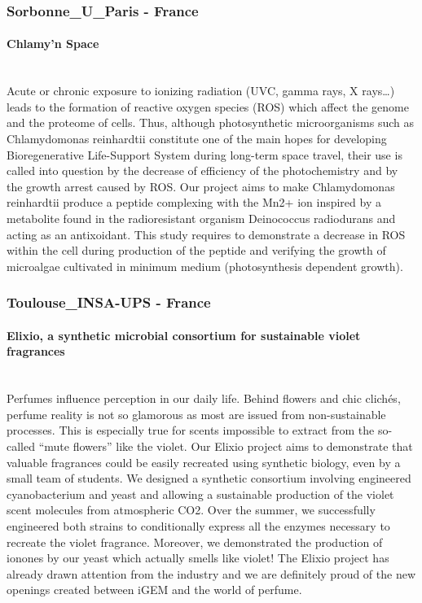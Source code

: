\subsubsection*{Sorbonne\_U\_Paris - France}
\paragraph{Chlamy'n Space}\mbox{} \\
Acute or chronic exposure to ionizing radiation (UVC, gamma rays, X rays…) leads to the formation of reactive oxygen species (ROS) which affect the genome and the proteome of cells. Thus, although photosynthetic microorganisms such as Chlamydomonas reinhardtii constitute one of the main hopes for developing Bioregenerative Life-Support System during long-term space travel, their use is called into question by the decrease of efficiency of the photochemistry and by the growth arrest caused by ROS. Our project aims to make Chlamydomonas reinhardtii produce a peptide complexing with the Mn2+ ion inspired by a metabolite found in the radioresistant organism Deinococcus radiodurans and acting as an antixoidant. This study requires to demonstrate a decrease in ROS within the cell during production of the peptide and verifying the growth of microalgae cultivated in minimum medium (photosynthesis dependent growth).

\subsubsection*{Toulouse\_INSA-UPS - France}
\paragraph{Elixio, a synthetic microbial consortium for sustainable violet fragrances}\mbox{} \\
Perfumes influence perception in our daily life. Behind flowers and chic clichés, perfume reality is not so glamorous as most are issued from non-sustainable processes. This is especially true for scents impossible to extract from the so-called “mute flowers” like the violet. Our Elixio project aims to demonstrate that valuable fragrances could be easily recreated using synthetic biology, even by a small team of students. We designed a synthetic consortium involving engineered cyanobacterium and yeast and allowing a sustainable production of the violet scent molecules from atmospheric CO2. Over the summer, we successfully engineered both strains to conditionally express all the enzymes necessary to recreate the violet fragrance. Moreover, we demonstrated the production of ionones by our yeast which actually smells like violet! The Elixio project has already drawn attention from the industry and we are definitely proud of the new openings created between iGEM and the world of perfume.

